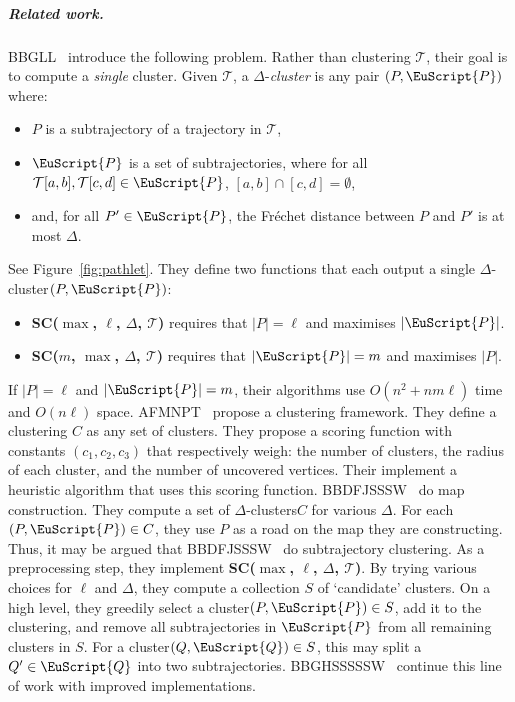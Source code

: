 \documentclass[11pt]{article}
\newcommand{\fancy}[1]{\EuScript{#1}}
\newcommand{\frechet}{Fr\'{e}chet\xspace}
\newcommand{\pathlet}{cluster\xspace}
\newcommand{\pathlets}{clusters\xspace}
\begin{document}
%
\subparagraph{Related work. }
BBGLL~\cite{buchin2011detecting} introduce the following problem. 
Rather than clustering $\mathcal{T}$, their goal is to compute a \emph{single} cluster. Given $\mathcal{T}$,  a $\Delta$-\emph{\pathlet} is any pair $(P, {\fancy{P}})$ where:
%
\begin{itemize}
    \item $P$ is a subtrajectory of a trajectory in $\mathcal{T}$,
    \item ${\fancy{P}}$ is a set of subtrajectories, where for all $\mathcal{T}[a, b], \mathcal{T}[c, d] \in {\fancy{P}}$, $[a, b] \cap [c, d] = \emptyset$,
    \item and, for all $P' \in {\fancy{P}}$, the \frechet distance between $P$ and $P'$ is at most $\Delta$. 
\end{itemize}
%
See Figure~\ref{fig:pathlet}.
They define two functions that each output a single $\Delta$-\pathlet $(P, {\fancy{P}})$:
%
\begin{itemize}
    \item \textbf{SC($\max$, $\ell$, $\Delta$, $\mathcal{T}$)} requires that $|P| = \ell$ and maximises $|{\fancy{P}}|$.
    \item \textbf{SC($m$, $\max$, $\Delta$, $\mathcal{T}$)}  requires  that $|{\fancy{P}}| = m$ and maximises $|P|$. 
\end{itemize}
%
  If $|P| = \ell$ and $|{\fancy{P}}| = m$, their algorithms use $O(n^2 + n m \ell)$ time and $O(n \ell)$ space.
%
%
AFMNPT~\cite{agarwal2018subtrajectory} propose a clustering framework.
They define a clustering $C$ as any set of \pathlets.
They propose a scoring function with constants $(c_1, c_2, c_3)$ that respectively weigh: the number of \pathlets, the radius of each \pathlet, and the number of uncovered vertices. 
Their implement a heuristic algorithm that uses this scoring function.
%
BBDFJSSSW~\cite{buchin2017clustering} do map construction.
They compute a set of $\Delta$-\pathlets $C$ for various $\Delta$. 
For each $(P, {\fancy{P}}) \in C$, they use $P$ as a road on the map they are constructing. 
Thus, it may be argued that BBDFJSSSW~\cite{buchin2017clustering} do subtrajectory clustering. 
As a preprocessing step, they implement \textbf{SC($\max$, $\ell$, $\Delta$, $\mathcal{T}$)}. By trying various choices for $\ell$ and $\Delta$, they compute a collection $S$ of `candidate' \pathlets. 
On a high level, they greedily select a \pathlet $(P, {\fancy{P}}) \in S$, add it to the clustering, and remove all subtrajectories in ${\fancy{P}}$ from all remaining \pathlets in $S$. For a \pathlet $(Q, {\fancy{Q}}) \in S$, this may split a $Q' \in {\fancy{Q}}$ into two subtrajectories. BBGHSSSSSW~\cite{buchin2020improved} continue this line of work with improved implementations. 
\end{document}
